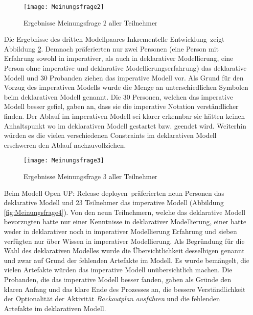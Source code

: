 \begin{figure}[htp]
\begin{center}
  \texttt{[image: Meinungsfrage2]} %
  \caption{Ergebnisse Meinungsfrage 2 aller Teilnehmer}
  \label{fig:Meinungsfrage2}
\end{center}
\end{figure}

Die Ergebnisse des dritten Modellpaares \grqq Inkrementelle Entwicklung\grqq \ zeigt Abbildung \ref{fig:Meinungsfrage3}. Demnach präferierten nur zwei Personen (eine Person mit Erfahrung sowohl in imperativer, als auch in deklarativer Modellierung, eine Person ohne imperative und deklarative Modellierungserfahrung) das deklarative Modell und 30 Probanden ziehen das imperative Modell vor.\newline
Als Grund für den Vorzug des imperativen Modells wurde die Menge an unterschiedlichen Symbolen beim deklarativen Modell genannt. \newline
Die 30 Personen, welchen das imperative Modell besser gefiel, gaben an, dass sie die imperative Notation verständlicher finden. Der Ablauf im imperativen Modell sei klarer erkennbar sie hätten keinen Anhaltspunkt wo im deklarativen Modell gestartet bzw. geendet wird. Weiterhin würden es die vielen verschiedenen Constraints im deklarativen Modell erschweren den Ablauf nachzuvollziehen.\newline

\begin{figure}[htp]
\begin{center}
  \texttt{[image: Meinungsfrage3]} %
  \caption{Ergebnisse Meinungsfrage 3 aller Teilnehmer}
  \label{fig:Meinungsfrage3}
\end{center}
\end{figure}

Beim Modell \grqq Open UP: Release deployen\grqq \ präferierten neun Personen das deklarative Modell und 23 Teilnehmer das imperative Modell (Abbildung \ref{fig:Meinungsfrage4}). Von den neun Teilnehmern, welche das deklarative Modell bevorzugten hatte nur einer Kenntnisse in deklarativer Modellierung, einer hatte weder in deklarativer noch in imperativer Modellierung Erfahrung und sieben verfügten nur über Wissen in imperativer Modellierung. \newline
Als Begründung für die Wahl des deklarativen Modelles wurde die Übersichtlichkeit desselbigen genannt und zwar auf Grund der fehlenden Artefakte im Modell. Es wurde bemängelt, die vielen Artefakte würden das imperative Modell unübersichtlich machen.\newline
Die Probanden, die das imperative Modell besser fanden, gaben als Gründe den klaren Anfang und das klare Ende des Prozesses an, die bessere Verständlichkeit der Optionalität der Aktivität \textit{Backoutplan ausführen} und die fehlenden Artefakte im deklarativen Modell. \newline



